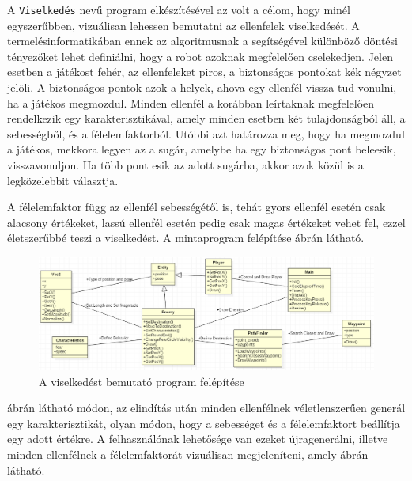 
A \texttt{Viselkedés} nevű program elkészítésével az volt a célom, hogy minél egyszerűbben, vizuálisan lehessen bemutatni az ellenfelek viselkedését. A termelésinformatikában ennek az algoritmusnak a segítségével különböző döntési tényezőket lehet definiálni, hogy a robot azoknak megfelelően cselekedjen. Jelen esetben a játékost fehér, az ellenfeleket piros, a biztonságos pontokat kék négyzet jelöli. A biztonságos pontok azok a helyek, ahova egy ellenfél vissza tud vonulni, ha a játékos megmozdul. Minden ellenfél a korábban leírtaknak megfelelően rendelkezik egy karakterisztikával, amely minden esetben két tulajdonságból áll, a sebességből, és a félelemfaktorból. Utóbbi azt határozza meg, hogy ha megmozdul a játékos, mekkora legyen az a sugár, amelybe ha egy biztonságos pont beleesik, visszavonuljon. Ha több pont esik az adott sugárba, akkor azok közül is a legközelebbit választja.

A félelemfaktor függ az ellenfél sebességétől is, tehát gyors ellenfél esetén csak alacsony értékeket, lassú ellenfél esetén pedig csak magas értékeket vehet fel, ezzel életszerűbbé teszi a viselkedést. A mintaprogram felépítése  ábrán látható.

\begin{figure}[h]
\centering
\includegraphics[scale=0.5]{kepek/behavior_uml.png}
\caption{A viselkedést bemutató program felépítése}
\label{fig:behavior_uml}
\end{figure}

 ábrán látható módon, az elindítás után minden ellenfélnek véletlenszerűen generál egy karakterisztikát, olyan módon, hogy a sebességet és a félelemfaktort beállítja egy adott értékre. A felhasználónak lehetősége van ezeket újragenerálni, illetve minden ellenfélnek a félelemfaktorát vizuálisan megjeleníteni, amely  ábrán látható.

